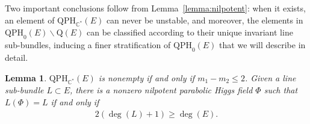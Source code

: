 \documentclass[10pt,a4paper]{amsart}
\newcommand{\field}[1]{\ensuremath{\mathbb{#1}}}
\newcommand{\CC}{\field{C}}
\numberwithin{equation}{section}
\newtheorem{Lemma}[Theorem]{Lemma}
\begin{document}
Two important conclusions follow from Lemma~\ref{lemma:nilpotent}: when it exists, an element of $\mathrm{QPH}_{\CC^{*}}(E)$ can never be unstable, and moreover, the elements in $\mathrm{QPH}_{0}(E)\backslash \mathrm{Q}(E)$ can be classified according to their unique invariant line sub-bundles, inducing a finer stratification of $\mathrm{QPH}_{0}(E)$ that we will describe in detail.

\begin{Lemma}\label{lemma:cases}
$\mathrm{QPH}_{\CC^{*}}(E)$ is nonempty if and only if $m_{1}-m_{2}\leq 2$. Given a line sub-bundle $L\subset E$, there is a nonzero nilpotent parabolic Higgs field $\Phi$ such that $L(\Phi)=L$ if and only if
\begin{gather}\label{eq:bound-deg(L)}
2(\deg(L)+1) \geq \deg (E).
\end{gather}
\end{Lemma}
\end{document}
